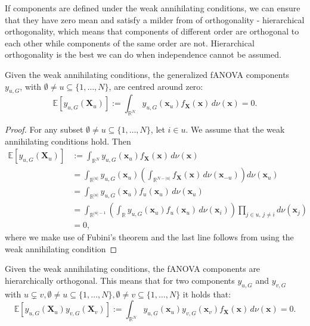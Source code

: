 If components are defined under the weak annihilating conditions, we can ensure that they have zero mean and satisfy a milder from of orthogonality - hierarchical orthogonality, which means that components of different order are orthogonal to each other while components of the same order are not. Hierarchical orthogonality is the best we can do when independence cannot be assumed.
\begin{proposition}
    Given the weak annihilating conditions, the generalized fANOVA components $y_{u, G}$, with $\emptyset \neq u \subseteq \{1, \ldots, N\}$, are centred around zero:
\begin{equation}
    \mathbb{E}[y_{u, G}(\boldsymbol{X}_u)] := \int_{\mathbb{R}^N} y_{u, G}(\boldsymbol{x}_u) f_{\boldsymbol{X}}(\boldsymbol{x}) \, d\nu (\boldsymbol{x}) = 0.
    \label{eq:zero_mean_g}
\end{equation}
\end{proposition}

\begin{proof}
For any subset $\emptyset \ne u \subseteq \{1, \ldots, N\}$, let $i \in u$. We assume that the weak annihilating conditions hold. Then
\begin{align*}
\mathbb{E}[y_{u,G}(\mathbf{X}_u)] 
&:= \int_{\mathbb{R}^N} y_{u,G}(\mathbf{x}_u) f_{\mathbf{X}}(\mathbf{x})\, d \nu (\mathbf{x}) \\
&= \int_{\mathbb{R}^{|u|}} y_{u,G}(\mathbf{x}_u) \left( \int_{\mathbb{R}^{N - |u|}} f_{\mathbf{X}}(\mathbf{x}) \, d \nu(\mathbf{x}_{-u}) \right) d \nu(\mathbf{x}_u) \\
&= \int_{\mathbb{R}^{|u|}} y_{u,G}(\mathbf{x}_u) f_u(\mathbf{x}_u)\, d \nu(\mathbf{x}_u) \\
&= \int_{\mathbb{R}^{|u| - 1}} \left( \int_{\mathbb{R}} y_{u,G}(\mathbf{x}_u) f_u(\mathbf{x}_u) \, d \nu(\mathbf{x}_i) \right) \prod_{j \in u,\, j \ne i} d \nu(\mathbf{x}_j) \\
&= 0,
\end{align*}
where we make use of Fubini's theorem and the last line follows from using the weak annihilating condition %
\end{proof}

\begin{proposition}
    Given the weak annihilating conditions, the fANOVA components are hierarchically orthogonal. This means that for two components $y_{u, G}$ and $y_{v, G}$ with $u \subsetneq v, \emptyset \neq u \subseteq \{1, \ldots, N\}, \emptyset \neq v \subseteq \{1, \ldots, N\} $ it holds that:
\begin{equation}
    \mathbb{E}[y_{u, G}(\boldsymbol{X}_u)y_{v, G}(\boldsymbol{X}_v)] := \int_{\mathbb{R}^N} y_{u, G}(\boldsymbol{x}_u) y_{v, G}(\boldsymbol{x}_v) f_{\boldsymbol{X}}(\boldsymbol{x}) \, d\nu (\boldsymbol{x}) = 0.
\end{equation}
\label{eq:orthogonality_g}
\end{proposition}

